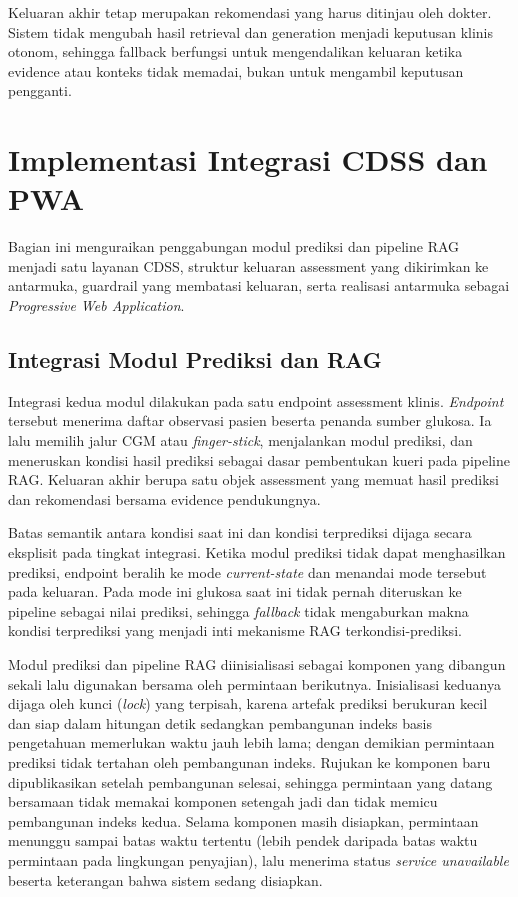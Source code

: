 Keluaran akhir tetap merupakan rekomendasi yang harus ditinjau oleh dokter. Sistem tidak mengubah hasil retrieval dan generation menjadi keputusan klinis otonom, sehingga
fallback berfungsi untuk mengendalikan keluaran ketika evidence atau konteks tidak memadai, bukan untuk mengambil keputusan pengganti.

\section{Implementasi Integrasi CDSS dan PWA}
\label{sec:bab5-implementasi-integrasi-cdss-pwa}

Bagian ini menguraikan penggabungan modul prediksi dan pipeline RAG menjadi satu layanan CDSS, struktur keluaran assessment yang dikirimkan ke antarmuka, guardrail
yang membatasi keluaran, serta realisasi antarmuka sebagai \textit{Progressive Web Application}.

\subsection{Integrasi Modul Prediksi dan RAG}
\label{subsec:bab5-integrasi-prediksi-rag}

Integrasi kedua modul dilakukan pada satu endpoint assessment klinis. \textit{Endpoint} tersebut menerima daftar observasi pasien beserta penanda sumber glukosa. Ia lalu memilih jalur CGM atau \textit{finger-stick}, menjalankan
modul prediksi, dan meneruskan kondisi hasil prediksi sebagai dasar pembentukan kueri pada pipeline RAG. Keluaran akhir berupa satu objek assessment yang memuat hasil prediksi dan rekomendasi bersama evidence pendukungnya.

Batas semantik antara kondisi saat ini dan kondisi terprediksi dijaga secara eksplisit pada tingkat integrasi. Ketika modul prediksi tidak dapat menghasilkan
prediksi, endpoint beralih ke mode \textit{current-state} dan menandai mode tersebut pada keluaran. Pada mode ini glukosa saat ini tidak pernah diteruskan ke
pipeline sebagai nilai prediksi, sehingga \textit{fallback} tidak mengaburkan makna kondisi terprediksi yang menjadi inti mekanisme RAG terkondisi-prediksi.

Modul prediksi dan pipeline RAG diinisialisasi sebagai komponen yang dibangun sekali lalu digunakan bersama oleh permintaan berikutnya. Inisialisasi keduanya dijaga oleh kunci (\textit{lock}) yang terpisah, karena artefak prediksi berukuran kecil dan siap dalam hitungan detik sedangkan pembangunan
indeks basis pengetahuan memerlukan waktu jauh lebih lama; dengan demikian permintaan prediksi tidak tertahan oleh pembangunan indeks. Rujukan ke komponen baru
dipublikasikan setelah pembangunan selesai, sehingga permintaan yang datang bersamaan tidak memakai komponen setengah jadi dan tidak memicu pembangunan indeks kedua.
Selama komponen masih disiapkan, permintaan menunggu sampai batas waktu tertentu (lebih pendek daripada batas waktu permintaan pada lingkungan penyajian), lalu
menerima status \textit{service unavailable} beserta keterangan bahwa sistem sedang disiapkan.

